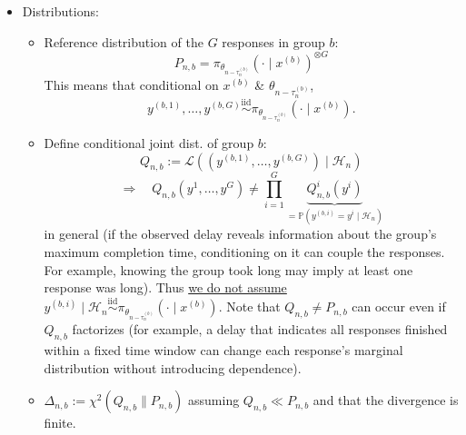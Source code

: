 \documentclass[10pt]{article}
\newcommand{\E}{\mathbb{E}}
\newcommand{\Pp}{\mathbb{P}}
\newcommand{\F}{\mathcal{F}}
\newcommand{\Hh}{\mathcal{H}}
\newcommand{\grad}{\nabla}
\newcommand{\xs}{x^{(b)}}
\theoremstyle{preserved}
\begin{document}
\begin{itemize}
\begin{itemize}
\begin{itemize}
\begin{align*}
        \E[g_n\mid\F_n^-]&=\frac1T\grad J(\theta_n)+b_n \\
        &=\frac1T\grad J(\theta_n)+\underbrace{p_n}_{\text{prompt selection bias}}+
    \E\left[\left.\frac1B\sum_{b=1}^B\left(\underbrace{s_{n,b}}_{\text{response selection bias}}+\underbrace{c_{n,b}}_{\text{GMC correction bias}}\right)\right|\F_n^-\right].
        \end{align*}
        \end{itemize} 
\end{itemize}
    \item Distributions:
    \begin{itemize}
        \item Reference distribution of the $G$ responses in group $b$: \begin{equation*}
        P_{n,b}=\pi_{\theta_{n-\tau_n^{(b)}}}(\cdot\mid x^{(b)})^{\otimes G}
        \end{equation*}
        This means that conditional on $x^{(b)}$ \& $\theta_{n-\tau_n^{(b)}}$,
        \begin{equation*} y^{(b,1)},\ldots,y^{(b,G)}\overset{\mathrm{iid}}\sim\pi_{\theta_{n-\tau_n^{(b)}}}(\cdot\mid x^{(b)}).
        \end{equation*}
        \item Define conditional joint dist. of group $b$:
        \begin{equation*} Q_{n,b}:=\mathcal{L}\left((y^{(b,1)},\ldots,y^{(b,G)})\mid\Hh_n\right)
        \end{equation*}
        \begin{equation*}
        \Rightarrow\quad Q_{n,b}(y^1,\ldots,y^G)\ne\prod_{i=1}^G\underbrace{Q^i_{n,b}(y^i)}_{=\Pp(y^{(b,i)}=y^i\mid\Hh_n)}
        \end{equation*}
        in general (if the observed delay reveals information about the group's maximum completion time, conditioning on it can couple the responses. For example, knowing the group took long may imply at least one response was long). Thus \underline{we do not assume} $y^{(b,i)}\mid\Hh_n\overset{\mathrm{iid}}\sim\pi_{\theta_{n-\tau_n^{(b)}}}(\cdot\mid\xs)$. Note that $Q_{n, b} \neq P_{n, b}$ can occur even if $Q_{n, b}$ factorizes (for example, a delay that indicates all responses finished within a fixed time window can change each response's marginal distribution without introducing dependence).
        \item $\Delta_{n,b}:=\chi^2(Q_{n,b}\|P_{n,b})$ assuming $Q_{n,b}\ll P_{n,b}$ and that the divergence is finite.
    \end{itemize}
\end{itemize}
\end{document}
